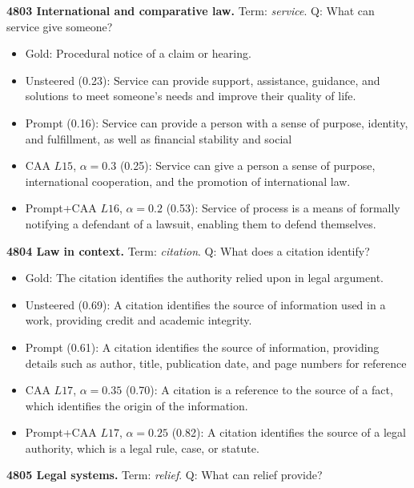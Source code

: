 \medskip\noindent\textbf{4803 International and comparative law.} Term: \emph{service}.
Q: What can service give someone?
\begin{itemize}\setlength{\itemsep}{0.15em}\setlength{\parsep}{0pt}\setlength{\topsep}{0.2em}
\item Gold: Procedural notice of a claim or hearing.
\item Unsteered (0.23): Service can provide support, assistance, guidance, and solutions to meet someone's needs and improve their quality of life.
\item Prompt (0.16): Service can provide a person with a sense of purpose, identity, and fulfillment, as well as financial stability and social
\item CAA $L15$, $\alpha=0.3$ (0.25): Service can give a person a sense of purpose, international cooperation, and the promotion of international law.
\item Prompt+CAA $L16$, $\alpha=0.2$ (0.53): Service of process is a means of formally notifying a defendant of a lawsuit, enabling them to defend themselves.
\end{itemize}
\medskip\noindent\textbf{4804 Law in context.} Term: \emph{citation}.
Q: What does a citation identify?
\begin{itemize}\setlength{\itemsep}{0.15em}\setlength{\parsep}{0pt}\setlength{\topsep}{0.2em}
\item Gold: The citation identifies the authority relied upon in legal argument.
\item Unsteered (0.69): A citation identifies the source of information used in a work, providing credit and academic integrity.
\item Prompt (0.61): A citation identifies the source of information, providing details such as author, title, publication date, and page numbers for reference
\item CAA $L17$, $\alpha=0.35$ (0.70): A citation is a reference to the source of a fact, which identifies the origin of the information.
\item Prompt+CAA $L17$, $\alpha=0.25$ (0.82): A citation identifies the source of a legal authority, which is a legal rule, case, or statute.
\end{itemize}
\medskip\noindent\textbf{4805 Legal systems.} Term: \emph{relief}.
Q: What can relief provide?
